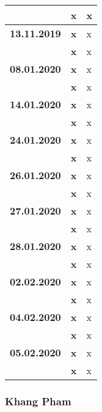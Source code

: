 {\begin{longtable}{|l|l|p{11cm}|}
			& \textbf{\hfill x} & x
		\\ 
		\hline \textbf{13.11.2019}
			& \textbf{\hfill x} & x \\\cline{2-3}	
			& \textbf{\hfill x} & x
		\\ 
		\hline \textbf{08.01.2020}
			& \textbf{\hfill x} & x \\\cline{2-3}
			& \textbf{\hfill x} & x
		\\ 
		\hline \textbf{14.01.2020}
			& \textbf{\hfill x} & x \\\cline{2-3}
			& \textbf{\hfill x} & x
		\\ 
		\hline \textbf{24.01.2020}
			& \textbf{\hfill x} & x \\\cline{2-3}
			& \textbf{\hfill x} & x
		\\ 
		\hline \textbf{26.01.2020}
			& \textbf{\hfill x} & x \\\cline{2-3}
			& \textbf{\hfill x} & x
		\\ 
		\hline \textbf{27.01.2020}
			& \textbf{\hfill x} & x \\\cline{2-3}
			& \textbf{\hfill x} & x
		\\ 
		\hline \textbf{28.01.2020}
			& \textbf{\hfill x} & x \\\cline{2-3}
			& \textbf{\hfill x} & x
		\\ 
		\hline \textbf{02.02.2020}
			& \textbf{\hfill x} & x \\\cline{2-3}
			& \textbf{\hfill x} & x
		\\ 
		\hline \textbf{04.02.2020}
			& \textbf{\hfill x} & x \\\cline{2-3}
			& \textbf{\hfill x} & x
		\\ 
		\hline \textbf{05.02.2020}
			& \textbf{\hfill x} & x \\\cline{2-3}
			& \textbf{\hfill x} & x \\
		\hline\hline
	\end{longtable}
}

\clearpage

\subsubsection{Khang Pham}

